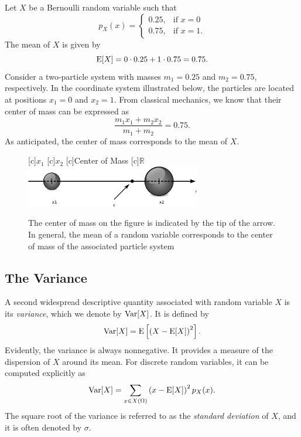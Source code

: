 \begin{example}
Let $X$ be a Bernoulli random variable such that
\begin{equation*}
p_X (x) = \left\{ \begin{array}{ll}
0.25, & \text{if }x = 0 \\
0.75, & \text{if }x = 1.
\end{array} \right.
\end{equation*}
The mean of $X$ is given by
\begin{equation*}
\mathrm{E} [X] = 0 \cdot 0.25 + 1 \cdot 0.75 = 0.75 .
\end{equation*}
Consider a two-particle system with masses $m_1 = 0.25$ and $m_2 = 0.75$, respectively.
In the coordinate system illustrated below, the particles are located at positions $x_1 = 0$ and $x_2 = 1$.
From classical mechanics, we know that their center of mass can be expressed as
\begin{equation*}
\frac{ m_1 x_1 + m_2 x_2 }{ m_1 + m_2 } = 0.75 .
\end{equation*}
As anticipated, the center of mass corresponds to the mean of $X$.

\begin{figure}[ht]
\begin{center}
\begin{psfrags}
[c]{$x_1$}
[c]{$x_2$}
[c]{Center of Mass}
[c]{$\mathbb{R}$}
\includegraphics[height=1.8cm]{Figures/6Chapter/mass}
\end{psfrags}
\end{center}
\caption{The center of mass on the figure is indicated by the tip of the arrow.
In general, the mean of a random variable corresponds to the center of mass of the associated particle system}
\end{figure}
\end{example}


\subsection{The Variance}

A second widespread descriptive quantity associated with random variable $X$ is its \emph{variance}, which we denote by $\mathrm{Var} [X]$. 
It is defined by
\begin{equation} \label{equation:VarianceExplicit}
\mathrm{Var} [X] = \mathrm{E} \left[ \left( X - \mathrm{E} [X] \right)^2 \right] .
\end{equation}
Evidently, the variance is always nonnegative.
It provides a measure of the dispersion of $X$ around its mean.
For discrete random variables, it can be computed explicitly as
\begin{equation*}
\mathrm{Var} [X] = \sum_{x \in X(\Omega)} \left( x - \mathrm{E} [X] \right)^2 p_X (x) .
\end{equation*}
The square root of the variance is referred to as the \emph{standard deviation} of $X$, and it is often denoted by $\sigma$. 

